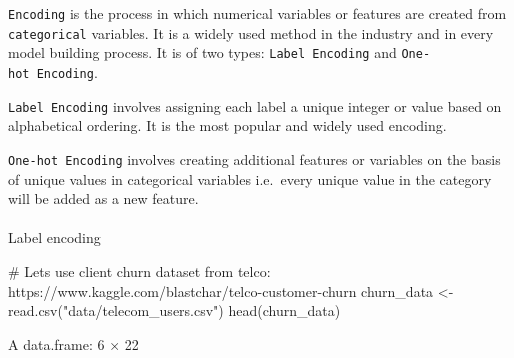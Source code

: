 \documentclass[
  letterpaper,
  DIV=11,
  numbers=noendperiod]{scrreprt}
\makeatletter
\let\oldparagraph\paragraph
\renewcommand{\paragraph}{
    \@ifstar
      \xxxParagraphStar
      \xxxParagraphNoStar
  }
\newcommand{\xxxParagraphStar}[1]{\oldparagraph*{#1}\mbox{}}
\newcommand{\xxxParagraphNoStar}[1]{\oldparagraph{#1}\mbox{}}
\newenvironment{Shaded}{\begin{snugshade}}{\end{snugshade}}
\newcommand{\CommentTok}[1]{\textcolor[rgb]{0.37,0.37,0.37}{#1}}
\newcommand{\FunctionTok}[1]{\textcolor[rgb]{0.28,0.35,0.67}{#1}}
\newcommand{\NormalTok}[1]{\textcolor[rgb]{0.00,0.23,0.31}{#1}}
\newcommand{\OtherTok}[1]{\textcolor[rgb]{0.00,0.23,0.31}{#1}}
\newcommand{\StringTok}[1]{\textcolor[rgb]{0.13,0.47,0.30}{#1}}
\makeatother
\begin{document}
\texttt{Encoding} is the process in which numerical variables or
features are created from \texttt{categorical} variables. It is a widely
used method in the industry and in every model building process. It is
of two types: \texttt{Label\ Encoding} and \texttt{One-hot\ Encoding}.

\texttt{Label\ Encoding} involves assigning each label a unique integer
or value based on alphabetical ordering. It is the most popular and
widely used encoding.

\texttt{One-hot\ Encoding} involves creating additional features or
variables on the basis of unique values in categorical variables
i.e.~every unique value in the category will be added as a new feature.

\paragraph{Label encoding}\label{label-encoding}

\begin{Shaded}
\begin{Highlighting}[]
\CommentTok{\# Lets use client churn dataset from telco: https://www.kaggle.com/blastchar/telco{-}customer{-}churn}
\NormalTok{churn\_data }\OtherTok{\textless{}{-}} \FunctionTok{read.csv}\NormalTok{(}\StringTok{"data/telecom\_users.csv"}\NormalTok{)}
\FunctionTok{head}\NormalTok{(churn\_data)}
\end{Highlighting}
\end{Shaded}

A data.frame: 6 × 22
\end{document}
